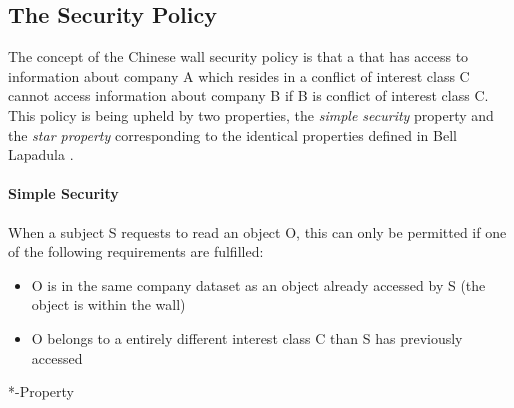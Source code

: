 \subsection{The Security Policy}
The concept of the Chinese wall security policy is that a \principal that has access to information about company A which resides in a conflict of interest class C cannot access information about company B if B is conflict of interest class C.
This policy is being upheld by two properties, the \emph{simple security} property and the \emph{star property} corresponding to the identical properties defined in Bell Lapadula .

\paragraph{Simple Security}

When a subject S requests to read an object O, this can only be permitted if one of the following requirements are fulfilled:

\begin{itemize}
\item O is in the same company dataset as an object already accessed by S (the object is within the wall)
\item O belongs to a entirely different interest class C than S has previously accessed
\end{itemize}



*-Property
